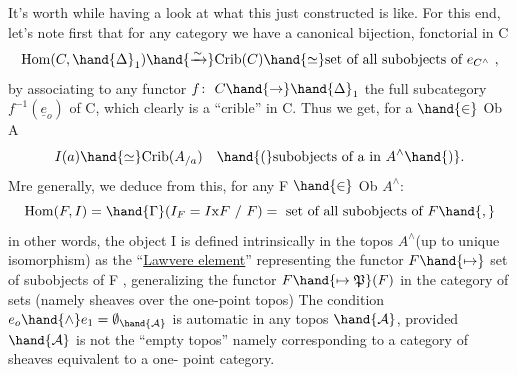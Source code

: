 It's worth while having a look at what this  just constructed is
like.  For this end,  let's note first that for any category\hand{,} we have
a canonical bijection,  fonctorial in C
\[ \mathrm{Hom}(C, \hand{\Delta}_1) \hand{\xrightarrow{\sim}} \mathrm{Crib}(C) \hand{\simeq} \text{set of all subobjects of } e_{C^{\wedge}} \ , \]
by associating to any functor $f\colon\ C \hand{\to} \hand{\Delta}_1$  the full subcategory $f^{-1}(\underline{e}_o)$ of
C,  which clearly is a ``crible''\inserted{[=sieve]} in C.  Thus we get,  for a $\hand{\in}$ Ob A
\[ I(a) \hand{\simeq} \mathrm{Crib}(A_{/a}) \quad \hand{(}\text{subobjects of a in } A^{\wedge}\hand{)}. \]
Mre generally,  we deduce from this,  for any F $\hand{\in}$ Ob $A^{\wedge}$:
\[ \mathrm{Hom}(F,I) = \hand{\Gamma}(I_F = I\mathrm{x}F \ / \ F) = \text{ set of all subobjects of } F\hand{,} \]
in other words, the object I is defined intrinsically in the topos $A^{\wedge}$\hand{/}(up
to unique isomorphism)  as the ``\uline{Lawvere element}''  representing the functor
$F \hand{\mapsto}$ set of subobjects of F ,  generalizing the functor  $F \hand{\mapsto \mathfrak{P}}(F)$ in the
category of sets (namely sheaves over the one-point topos)\hand{,}  The  condition
$e_o \hand{\wedge} e_1 = \emptyset_{\hand{\mathcal{A}}}$  is automatic in any topos $\hand{\mathcal{A}}$, provided $\hand{\mathcal{A}}$ is not the ``empty
topos''  namely corresponding to a category of sheaves equivalent to a one-%
point category. 
